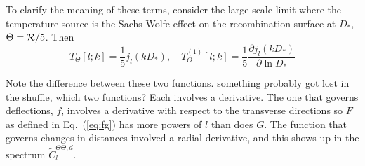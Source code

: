 \documentclass[prl,amsmath,amssymb,floatfix,superscriptaddress,nofootinbib,twocolumn]{revtex4-1}
\def\be{\begin{equation}}
\def\ee{\end{equation}}
\def\bea{\begin{eqnarray}}
\def\eea{\end{eqnarray}}
\newcommand{\vs}{\nonumber\\}
\newcommand{\ec}[1]{Eq.~(\ref{eq:#1})}
\newcommand{\eql}[1]{\label{eq:#1}}
\newcommand{\wh}[1]{{\color{red} #1}}
\begin{document}
To clarify the meaning of these terms, consider the large scale limit where the temperature
source is the Sachs-Wolfe effect on the recombination surface at $D_*$, 
 $\Theta = {\cal R}/5$.   Then
 \begin{equation}
 T_\Theta[l;k] = \frac{1}{5} j_l(k D_*), \quad  T_\Theta^{(1)}[l;k] = \frac{1}{5}
 \frac{\partial j_l(k D_*)}{\partial \ln D_*}
\end{equation}


Note the difference between these two functions. \wh{something probably got lost in the shuffle, which two functions?}  Each involves a derivative. The one that governs deflections, $f$, %
involves a derivative with respect to the transverse directions so $F$ as defined in \ec{fg} has more powers of $l$ than does $G$.  
The function that governs changes in distances involved a radial derivative, and this shows up in the spectrum $\tilde{C}^{\Theta\Theta,d}_{l}$.
\end{document}
